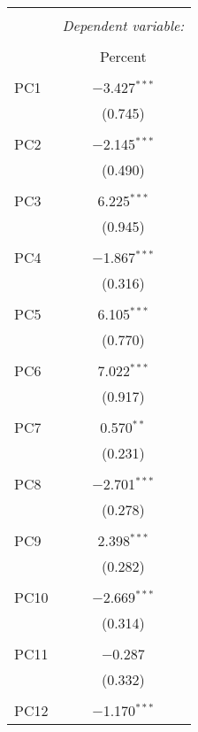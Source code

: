 
\begin{table}[!htbp] \centering 
  \caption{} 
  \label{} 
\begin{tabular}{@{\extracolsep{5pt}}lc} 
\\[-1.8ex]\hline 
\hline \\[-1.8ex] 
 & \multicolumn{1}{c}{\textit{Dependent variable:}} \\ 
\cline{2-2} 
\\[-1.8ex] & Percent \\ 
\hline \\[-1.8ex] 
 PC1 & $-$3.427$^{***}$ \\ 
  & (0.745) \\ 
  & \\ 
 PC2 & $-$2.145$^{***}$ \\ 
  & (0.490) \\ 
  & \\ 
 PC3 & 6.225$^{***}$ \\ 
  & (0.945) \\ 
  & \\ 
 PC4 & $-$1.867$^{***}$ \\ 
  & (0.316) \\ 
  & \\ 
 PC5 & 6.105$^{***}$ \\ 
  & (0.770) \\ 
  & \\ 
 PC6 & 7.022$^{***}$ \\ 
  & (0.917) \\ 
  & \\ 
 PC7 & 0.570$^{**}$ \\ 
  & (0.231) \\ 
  & \\ 
 PC8 & $-$2.701$^{***}$ \\ 
  & (0.278) \\ 
  & \\ 
 PC9 & 2.398$^{***}$ \\ 
  & (0.282) \\ 
  & \\ 
 PC10 & $-$2.669$^{***}$ \\ 
  & (0.314) \\ 
  & \\ 
 PC11 & $-$0.287 \\ 
  & (0.332) \\ 
  & \\ 
 PC12 & $-$1.170$^{***}$ \\ 

\end{tabular}
\end{table}
